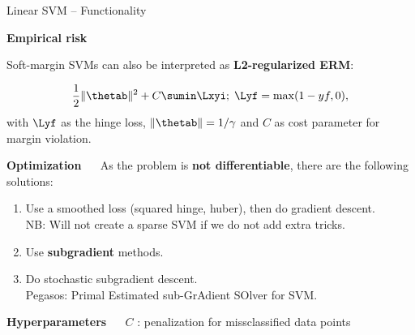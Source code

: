 \documentclass[11pt,compress,t,notes=noshow, xcolor=table]{beamer}
\newcommand{\highlight}[1]{\textcolor{highlightcol}{\textbf{#1}}}
\begin{document}
\begin{frame}{Linear SVM -- Functionality}

\footnotesize

\highlight{Empirical risk}

Soft-margin SVMs can also be interpreted as \textbf{L2-regularized ERM}: 

$$ \frac{1}{2} \|\thetab\|^2 + C \sumin \Lxyi ;\; \Lyf = \max(1-yf, 0),$$ 
with $\Lyf$ as the hinge loss, $\|\thetab\| = 1 / \gamma$ and $C$ as cost parameter for margin violation.

\medskip

\highlight{Optimization} ~~
As the problem is \textbf{not differentiable}, there are the following solutions: 
\begin{enumerate}
\item Use a smoothed loss (squared hinge, huber), then do gradient descent.\\
  NB: Will not  create a sparse SVM if we do not add extra tricks.
\item Use \textbf{subgradient} methods.
\item Do stochastic subgradient descent.\\
  Pegasos: Primal Estimated sub-GrAdient SOlver for SVM.
\end{enumerate}

\medskip

\highlight{Hyperparameters} ~~ \textbf{$C$} : penalization for missclassified data points 


\medskip

\end{frame}

\end{document}
